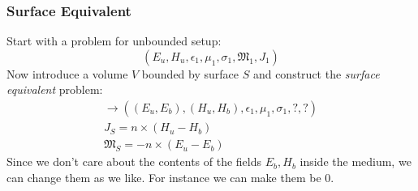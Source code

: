\documentclass{article}
\numberwithin{equation}{section}
\begin{document}
            \subsubsection*{Surface Equivalent}
            Start with a problem for unbounded setup:
            \begin{equation} \label{eq:unboundedSetup}
                \left( E_u, H_u, \epsilon_1, \mu_1, \sigma_1, \mathfrak{M}_1, J_1 \right)
            \end{equation}
            Now introduce a volume $V$ bounded by surface $S$ and construct the
            \emph{surface equivalent} problem:
            \begin{subequations} \label{eq:surfaceEquivalent}
                \begin{align}
                    \to \left( (E_u,E_b), (H_u, H_b), \epsilon_1, \mu_1, \sigma_1, ?, ?
                        \right) \\
                    J_S = n \times ( H_u - H_b ) \\
                    \mathfrak{M}_S = -n \times ( E_u - E_b )
                \end{align}
            \end{subequations}
            Since we don't care about the contents of the fields $E_b, H_b$ inside the
            medium, we can change them as we like. For instance we can make them be 0.
\end{document}
